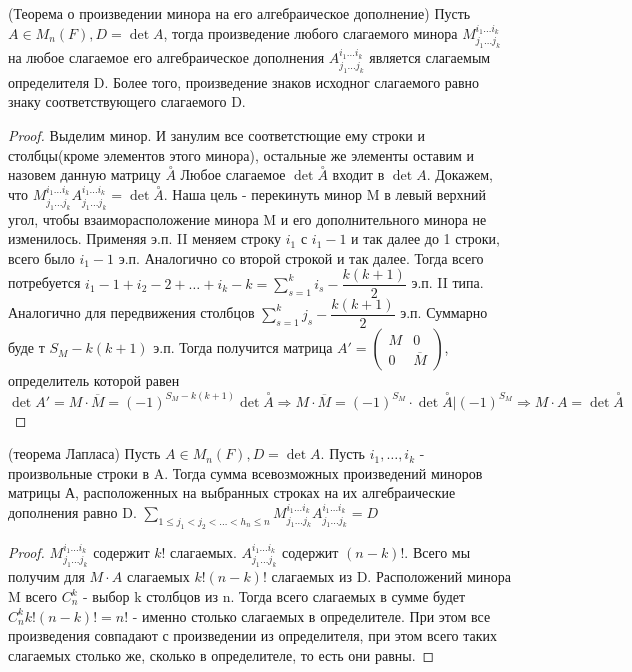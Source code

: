 \begin{theorem}
	(Теорема о произведении минора на его алгебраическое дополнение) \newline
	Пусть \(A\in M_n(F), D=\det A\), тогда произведение любого слагаемого минора \(M_{j_1\ldots j_k}^{i_1\ldots i_k}\) на любое слагаемое его алгебраическое дополнения \(A_{j_1\ldots j_k}^{i_1\ldots i_k}\) является слагаемым определителя D. Более того, произведение знаков исходног слагаемого равно знаку соответствующего слагаемого D.
\end{theorem}
\begin{proof}
	Выделим минор. И занулим все соответстющие ему строки и столбцы(кроме элементов этого минора), остальные же элементы оставим и назовем данную матрицу \( \overset{\circ}{A}\) Любое слагаемое $\det \overset{\circ}{A}$ входит в \(\det A\). Докажем, что \(M_{j_1\ldots j_k}^{i_1\ldots i_k}A_{j_1\ldots j_k}^{i_1\ldots i_k} = \det \overset{\circ}{A}\). Наша цель - перекинуть минор M в левый верхний угол, чтобы взаиморасположение минора M и его дополнительного минора не изменилось. Применяя э.п. II меняем строку \(i_1\) с $i_1-1$ и так далее до 1 строки, всего было $i_1-1$ э.п. Аналогично со второй строкой и так далее. Тогда всего потребуется \(i_1 -1 + i_2-2+\ldots + i_k-k = \sum_{s=1}^{k}i_s - \dfrac{k(k+1)}{2}\) э.п. II типа. Аналогично для передвижения столбцов \(\sum_{s=1}^{k}j_s - \dfrac{k(k+1)}{2}\) э.п. Суммарно буде т \(S_M - k(k+1)\) э.п. Тогда получится матрица \( A'=\begin{pmatrix}
		M & 0 \\
		0 & \overline{M}
	\end{pmatrix}\), определитель которой равен \(\det A' = M\cdot \overline{M} = (-1)^{S_M - k(k+1)}\det\overset{\circ}{A} \Longrightarrow M\cdot \overline M = (-1)^{S_M}\cdot \det \overset{\circ}{A}|(-1)^{S_M} \Longrightarrow M\cdot A = \det \overset{\circ}{A}\)
\end{proof}
\begin{theorem}
	(теорема Лапласа) \newline
	\label{laplas}
	Пусть \(A\in M_n(F), D = \det A\). Пусть \(i_1, \ldots, i_k\) - произвольные строки в A. Тогда сумма всевозможных произведений миноров матрицы А, расположенных на выбранных строках на их алгебраические дополнения равно D.
	\(\sum_{1\le j_1<j_2<\ldots <h_n\le n} M_{j_1\ldots j_k}^{i_1\ldots i_k}A_{j_1\ldots j_k}^{i_1\ldots i_k} = D\)
\end{theorem}
\begin{proof}
	\(M_{j_1\ldots j_k}^{i_1\ldots i_k}\) содержит \(k!\) слагаемых. \(A_{j_1\ldots j_k}^{i_1\ldots i_k}\) содержит \((n-k)!\). Всего мы получим  для \(M\cdot A\) слагаемых \(k!(n-k)!\) слагаемых из D. Расположений минора M всего \(C_n^k\) - выбор k столбцов из n. Тогда всего слагаемых в сумме будет \(C_n^k k!(n-k)! = n!\) - именно столько слагаемых в определителе. При этом все произведения совпадают с произведении из определителя, при этом всего таких слагаемых столько же, сколько в определителе, то есть они равны.
\end{proof}
